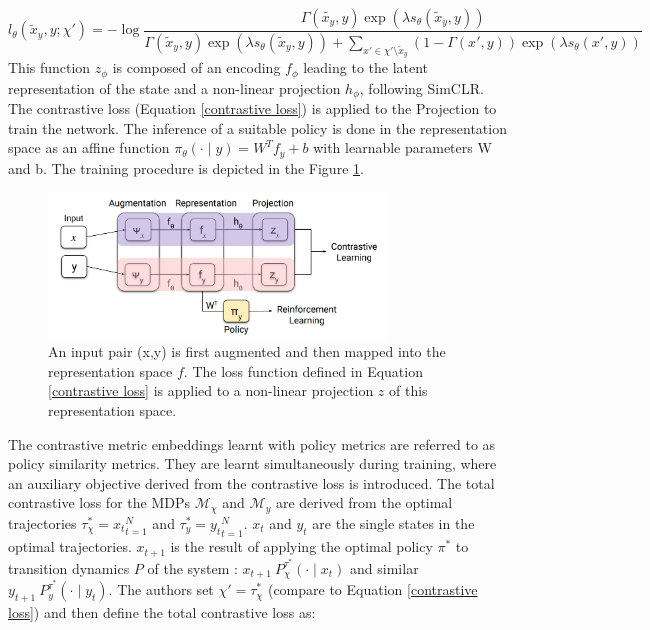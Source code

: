 \documentclass{usiinftr}
\begin{document}
\begin{equation}\label{contrastive loss}
l_{\theta} (\tilde{x}_y, y; \chi' ) = 
- \log \frac{\Gamma (\tilde{x_y}, y ) \exp(\lambda s_{\theta} (\tilde{x}_y, y))}
{\Gamma(\tilde{x}_y, y) \exp (\lambda s_{\theta}(\tilde{x}_y, y)) + \sum_{x'\in \chi' \setminus {\tilde{x}_y}} (1 - \Gamma (x',y)) \exp (\lambda s_{\theta} (x',y))}
\end{equation}
This function $z_\phi$ is composed of an encoding $f_\phi$ leading to the latent representation of the state and a non-linear projection $h_\phi$, following SimCLR. The contrastive loss (Equation \ref{contrastive loss}) is applied to the Projection to train the network. The inference of a suitable policy is done in the representation space as an affine function $\pi_\theta (\cdot \mid y) = W^T f_y + b$
with learnable parameters W and b. The training procedure is depicted in the Figure \ref{fig: Learning_Architecture}.

\begin{figure} 
\centering
\includegraphics[width = 0.8\textwidth]{figures/Learning_architecture.png}
\caption{\label{fig: Learning_Architecture}An input pair (x,y) is first augmented and then mapped into the representation space $f$. The loss function defined in Equation \ref{contrastive loss} is applied to a non-linear projection $z$ of this representation space.}
\end{figure}

The contrastive metric embeddings learnt with policy metrics are referred to as policy similarity metrics. They are learnt simultaneously during training, where an auxiliary objective derived from the contrastive loss is introduced.
The total contrastive loss for the MDPs $\mathcal{M}_\chi$ and $\mathcal{M}_y$ are derived from the optimal trajectories $\tau_\chi^* = {x_t}_{t = 1}^N$ and $\tau_y^* = {y_t}_{t = 1}^N$.
$x_t$ and $y_t$ are the single states in the optimal trajectories. $x_{t+1}$ is the result of applying the optimal policy $\pi^*$ to transition dynamics $P$ of the system : $x_{t+1} ~P_\chi^{\tau^*} (\cdot \mid x_t)$ and similar
$y_{t+1} ~ P_y^{\tau^*} (\cdot \mid y_t)$.
The authors set $\chi' = \tau_\chi^*$ (compare to Equation \ref{contrastive loss}) and then define the total contrastive loss as:
\end{document}
